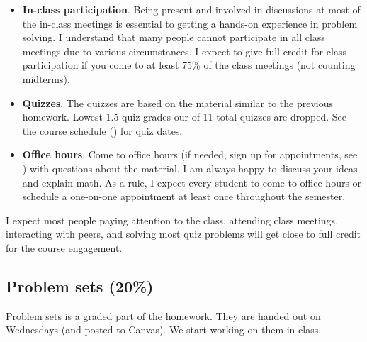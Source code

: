\documentclass[oneside,11pt]{amsart}
\begin{document}
\begin{itemize}
	\item \textbf{In-class participation}. 
		Being present and involved in discussions at most of the in-class meetings
		is essential to getting a hands-on experience 
		in problem solving. 
		I understand that many people cannot participate in all class meetings due to various
		circumstances. 
		I expect to give full credit for class participation 
		if you come to at least 75\% of the class meetings (not counting midterms).
	\item \textbf{Quizzes}. 
		The quizzes are based on the material similar to the previous homework.
		Lowest $1.5$ quiz grades our of 11 total quizzes are dropped.
		See the course schedule () for quiz dates.
	\item \textbf{Office hours}. Come to office hours (if needed, 
		sign up for appointments, see ) 
		with questions about the material.
		I am always happy to discuss your ideas and explain math.
		As a rule, I expect every student to come to office hours or schedule a one-on-one appointment
		at least once throughout the semester.
\end{itemize}

I expect most people paying attention to the class, attending class meetings, interacting with peers, and solving most quiz problems will get close to full credit for the course engagement.

\subsection{Problem sets (20\%)}

Problem sets is a graded part of the homework. They are handed out on Wednesdays (and posted to Canvas).
We start working on them in class.

\medskip
\end{document}

